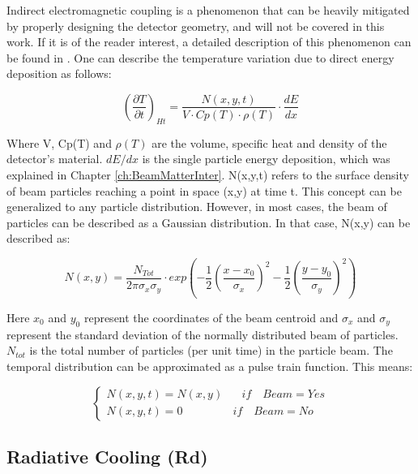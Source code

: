 Indirect electromagnetic coupling is a phenomenon that can be heavily mitigated by properly designing the detector geometry, and will not be covered in this work. If it is of the reader interest, a detailed description of this phenomenon can be found in \parencite[][]{ref:ElectroHeating}. One can describe the temperature variation due to direct energy deposition as follows: 

\begin{equation}
    \left(\frac{\partial T}{\partial t}\right)_{Ht} = \frac{N (x,y,t)}{V\cdot Cp(T)\cdot \rho (T)}\cdot \frac{dE}{dx}
\end{equation}

Where V, Cp(T) and $\rho (T)$ are the volume, specific heat and density of the detector's material. $dE/dx$ is the single particle energy deposition, which was explained in Chapter \ref{ch:BeamMatterInter}. N(x,y,t) refers to the surface density of beam particles reaching a point in space (x,y) at time t. This concept can be generalized to any particle distribution. However, in most cases, the beam of particles can be described as a Gaussian distribution. In that case, N(x,y) can be described as: 

\begin{equation}
    N(x,y) = \frac{N_{Tot}}{2 \pi \sigma_x \sigma_y}\cdot exp \left(
              -\frac{1}{2}\left(\frac{x-x_0}{\sigma_x}\right)^2 - \frac{1}{2}\left(\frac{y - y_0}{\sigma_y}\right)^2\right)
\end{equation}

Here $x_0$ and $y_0$ represent the coordinates of the beam centroid and $\sigma_x$ and $\sigma_y$ represent the standard deviation of the normally distributed beam of particles. $N_{tot}$ is the total number of particles (per unit time) in the particle beam. The temporal distribution can be approximated as a pulse train function. This means: 

\begin{equation}
    \begin{cases}
      N(x,y,t) = N(x,y) \mspace{30mu} if\mspace{18mu}Beam = Yes \\
      N(x,y,t) = 0 \mspace{80mu} if \mspace{18mu}Beam = No 
    \end{cases}
\end{equation}

\subsection{Radiative Cooling (Rd)}

